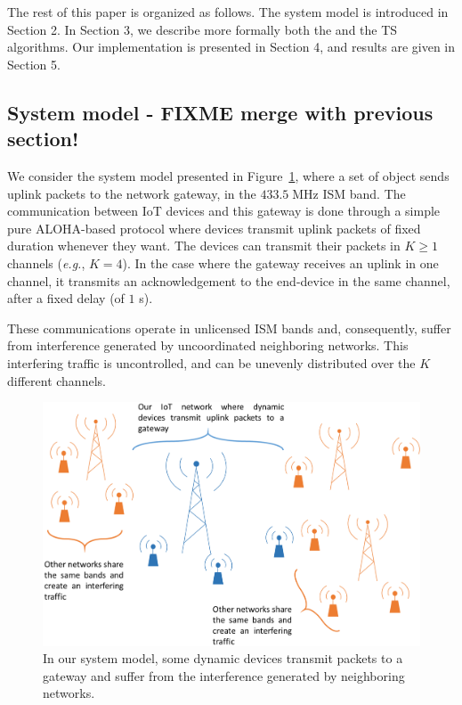 The rest of this paper is organized as follows. The system model is introduced in Section 2. In Section 3, we describe more formally both the \UCB{} and the TS algorithms. Our implementation is presented in Section 4, and results are given in Section 5.


\subsection{System model - FIXME merge with previous section!}

We consider the system model presented in Figure~\ref{fig:42:system_model1}, where a set of object sends uplink packets to the network gateway, in the $433.5\;\mathrm{MHz}$ ISM band.
The communication between IoT devices and this gateway is done through a simple pure ALOHA-based protocol where devices transmit uplink packets of fixed duration whenever they want.
%
The devices can transmit their packets in $K\geq 1$ channels (\emph{e.g.}, $K=4$). In the case where the gateway receives an uplink in one channel, it transmits an acknowledgement to the end-device in the same channel, after a fixed delay (of $1$ s).

These communications operate in unlicensed ISM bands and, consequently, suffer from interference generated by uncoordinated neighboring networks. This interfering traffic is uncontrolled, and can be unevenly distributed over the $K$ different channels.

%

\begin{figure}[!t]
    \centering
    \includegraphics[width=0.65\linewidth]{2-Chapters/4-Chapter/IEEE_WCNC_2019__DemoICT.git/pictures/system_model1.eps}
    \caption{In our system model, some dynamic devices transmit packets to a gateway and suffer from the interference generated by neighboring networks.}
    \label{fig:42:system_model1}
\end{figure}

